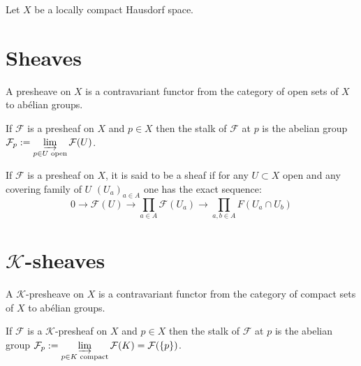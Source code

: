 
Let $X$ be a locally compact Hausdorf space.

\section{Sheaves}


\begin{definition}\label{def:pre_sheaves}
    A presheave on $X$ is a contravariant functor from the category of open sets of $X$ to abélian groups.
\end{definition}

\begin{definition}\label{def:stalk}
    If $\mathcal{F}$ is a presheaf on $X$ and $p\in X$ then the stalk of $\mathcal{F}$ at $p$ is the abelian group $\mathcal{F}_p:=\varinjlim\limits_{p\in U\text{ open}}\mathcal{F}(U)$.
\end{definition}

\begin{definition}\label{def:sheaves}
    If $\mathcal{F}$ is a presheaf on $X$, it is said to be a sheaf if for any $U\subset X$ open and any covering family of $U$ $(U_a)_{a\in A}$ one has the exact sequence:
    \begin{equation}\label{axiom:Sh}
        0\to \mathcal{F}(U)\to \prod\limits_{a\in A}\mathcal{F}(U_a)\to \prod\limits_{a,b\in A}F(U_a\cap U_b)
    \end{equation}
\end{definition}

\section{$\mathcal{K}$-sheaves}

\begin{definition}\label{def:K_pre_sheaves}
    A $\mathcal{K}$-presheave on $X$ is a contravariant functor from the category of compact sets of $X$ to abélian groups.
\end{definition}

\begin{definition}\label{def:K_stalk}
    If $\mathcal{F}$ is a $\mathcal{K}$-presheaf on $X$ and $p\in X$ then the stalk of $\mathcal{F}$ at $p$ is the abelian group $\mathcal{F}_p:=\varinjlim\limits_{p\in K\text{ compact}}\mathcal{F}(K)=\mathcal{F}(\{p\})$.  
\end{definition}

